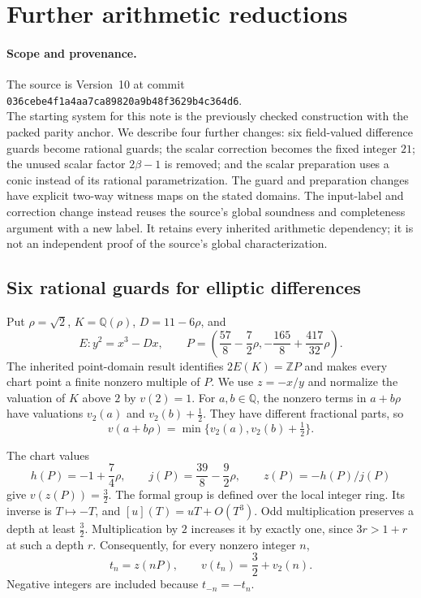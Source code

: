 \section{Further arithmetic reductions}

\paragraph{Scope and provenance.}
The source is Version~10 at commit\\
{\small\nolinkurl{036cebe4f1a4aa7ca89820a9b48f3629b4c364d6}}.\\
The starting system for this note is the previously checked construction
with the packed parity anchor. We describe four further changes:
six field-valued difference guards become rational guards; the scalar
correction becomes the fixed integer $21$; the unused scalar factor
$2\beta-1$ is removed; and the scalar preparation uses a conic instead
of its rational parametrization.
The guard and preparation changes have explicit two-way witness maps on
the stated domains. The input-label and correction change instead reuses
the source's global soundness and completeness argument with a new label.
It retains every inherited arithmetic dependency; it is not an independent
proof of the source's global characterization.

\subsection{Six rational guards for elliptic differences}

Put $\rho=\sqrt2$, $K=\mathbb Q(\rho)$, $D=11-6\rho$, and
\[
 E:y^2=x^3-Dx,\qquad
 P=\left(\frac{57}{8}-\frac72\rho,
          -\frac{165}{8}+\frac{417}{32}\rho\right).
\]
The inherited point-domain result identifies $2E(K)=\mathbb ZP$ and
makes every chart point a finite nonzero multiple of $P$.
We use $z=-x/y$ and normalize the valuation of $K$ above $2$ by $v(2)=1$.
For $a,b\in\mathbb Q$, the nonzero terms in $a+b\rho$ have valuations
$v_2(a)$ and $v_2(b)+\tfrac12$. They have different fractional parts, so
\begin{equation}\label{further:eq:componentvaluation}
 v(a+b\rho)=\min\{v_2(a),v_2(b)+\tfrac12\}.
\end{equation}

The chart values
\[
 h(P)=-1+\frac74\rho,\qquad
 j(P)=\frac{39}{8}-\frac92\rho,\qquad z(P)=-h(P)/j(P)
\]
give $v(z(P))=\tfrac32$. The formal group is defined over the local
integer ring. Its inverse is $T\mapsto-T$, and
$[u](T)=uT+O(T^3)$. Odd multiplication preserves a depth at least
$\tfrac32$. Multiplication by $2$ increases it by exactly one, since
$3r>1+r$ at such a depth $r$. Consequently, for every nonzero integer $n$,
\begin{equation}\label{further:eq:multipledepth}
 t_n=z(nP),\qquad v(t_n)=\frac32+v_2(n).
\end{equation}
Negative integers are included because $t_{-n}=-t_n$.

